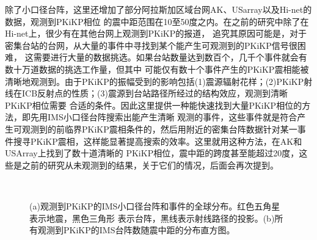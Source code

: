 除了小口径台阵，这里还增加了部分阿拉斯加区域台网AK、USarray以及Hi-net的数据，观测到PKiKP相位
的震中距范围在10至50度之内。在之前的研究中除了在Hi-net上，很少有在其他台网上观测到PKiKP的报道，
追究其原因可能是，对于密集台站的台网，从大量的事件中寻找到某个能产生可观测到的PKiKP信号很困难，
这需要进行大量的数据挑选。如果台站数量达到数百个，几千个事件就会有数十万道数据的挑选工作量，但其中
可能仅有数十个事件产生的PKiKP震相能被清晰地观测到。由于PKiKP的振幅受到的影响包括(1)震源辐射花样；(2)PKiKP射线在ICB反射点的性质；(3)震源到台站路径所经过的结构效应，观测到清晰PKiKP相位需要
合适的条件。因此这里提供一种能快速找到大量PKiKP相位的方法，即先用IMS小口径台阵搜索出能产生清晰
观测的事件，这些事件就是符合产生可观测到的前临界PKiKP震相条件的，然后用附近的密集台阵数据针对某一事件搜寻PKiKP震相，这样能显著提高搜索的效率。这里就用这种方法，在AK和USArray上找到了数十道清晰的
PKiKP相位，震中距的跨度甚至能超过20度，这些是之前的研究从未观测到的结果，关于它们的情况，后面会再次提到。

\begin{figure}
	\centering
\\
	\caption{(a)观测到PKiKP的IMS小口径台阵和事件的全球分布。红色五角星表示地震，黑色三角形%
表示台阵，黑线表示射线路径的投影。(b)所有观测到PKiKP的IMS台阵数随震中距的分布直方图。}
	\label{distibution}
\end{figure}

